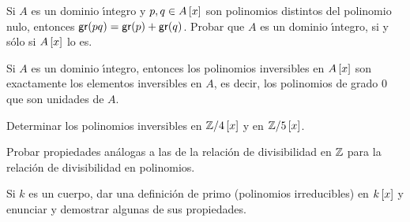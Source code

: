 \begin{ejerPolinomios}
	Si $A$ es un dominio \'{\i}ntegro y $p,q\in\polinomios A x$ son
	polinomios distintos del polinomio nulo, entonces
	$\grado(pq)=\grado(p)+\grado(q)$. Probar que $A$ es un dominio
	\'{\i}ntegro, si y s\'olo si $\polinomios A x$ lo es.
\end{ejerPolinomios}

\begin{ejerPolinomios}
	Si $A$ es un dominio \'{\i}ntegro, entonces los polinomios
	inversibles en $\polinomios A x$ son exactamente los elementos
	inversibles en $A$, es decir, los polinomios de grado $0$ que son
	unidades de $A$.
\end{ejerPolinomios}

\begin{ejerPolinomios}
	Determinar los polinomios inversibles en
	$\polinomios{\simEnterosmod[4]} x$ y en
	$\polinomios{\simEnterosmod[5]} x$.
\end{ejerPolinomios}

\begin{ejerPolinomios}\label{ejer:polinomios:divisibilidad}
	Probar propiedades an\'alogas a las de la relaci\'on de divisibilidad
	en $\Enteros$ para la relaci\'on de divisibilidad en polinomios.
\end{ejerPolinomios}

\begin{ejerPolinomios}\label{ejer:polinomios:irreducibles}
	Si $k$ es un cuerpo, dar una definici\'on de primo (polinomios
	irreducibles) en $\polinomios k x$ y enunciar y demostrar algunas
	de sus propiedades.
\end{ejerPolinomios}

